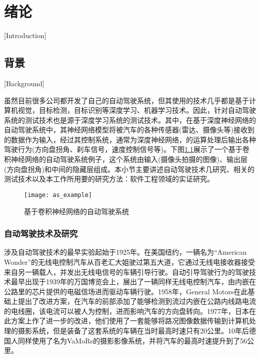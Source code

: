 \newcommand{\specialcell}[2][c]{%
  \begin{tabular}[#1]{@{}c@{}}#2\end{tabular}}
\newcommand{\mthead}[1]{\textit{\textbf{#1}}}

\newcommand{\newmodel}[1]{\textbf{#1.}\cite{#1}\quad}

\chapter{绪论}[Introduction]

\section{背景}[Background]

虽然目前很多公司都开发了自己的自动驾驶系统，但其使用的技术几乎都是基于计算机视觉，目标检测，目标识别等深度学习、机器学习技术。因此，针对自动驾驶系统的测试技术也是源于深度学习系统的测试技术。其中，在基于深度神经网络的自动驾驶系统中，其神经网络模型将被汽车的各种传感器(雷达、摄像头等)接收到的数据作为输入，经过其控制系统，通常为深度神经网络，的运算处理后输出各种驾驶行为(方向盘拐角、刹车信号，速度控制信号等)。下图\ref{as_example}展示了一个基于卷积神经网络的自动驾驶系统例子，这个系统由输入(摄像头拍摄的图像)、输出层(方向盘拐角)和中间的隐藏层组成。本小节主要讲述自动驾驶技术几研究、相关的测试技术以及本工作所用要的研究方法：软件工程领域的实证研究。

\begin{figure}[h]
    \centering
    \texttt{[image: as\_example]}
    \caption{基于卷积神经网络的自动驾驶系统\cite{DeepRoad}}
    \label{as_example}
\end{figure}

\subsection{自动驾驶技术及研究}

涉及自动驾驶技术的最早实验起始于1925年\cite{auto-driving-history}。在美国纽约，一辆名为“American Wonder”的无线电控制汽车从百老汇大姐驶过第五大道，它通过无线电接收器接受来自另一辆载人，并发出无线电信号的车辆引导行驶。自动引导驾驶行为的驾驶技术最早出现于1939年的万国博览会上，展出了一辆同样无线电控制汽车，由内嵌在公路里的芯片提供的电磁信场进而驱动车辆行驶。1958年，General Motors在此基础上提出了改进方案，在汽车的前部添加了能够检测到流过内嵌在公路内线路电流的电线圈，该电流可以被人为控制，进而影响汽车的方向盘转向。1977年，日本在此方案上作了进一步的改进，他们使用了一套能够将路况图像数据传输到计算机处理的摄影系统，但是装备了这套系统的车辆在当时最高时速只有20公里。10年后德国人同样使用了名为VaMoRs的摄影影像系统，并将汽车的最高时速提升到了56公里。 

